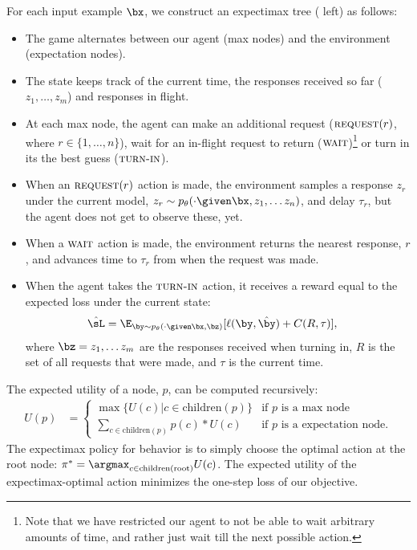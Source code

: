 For each input example $\bx$, we construct an expectimax tree ( left) as follows: 
\begin{itemize}
  \item The game alternates between our agent (max nodes) and the environment (expectation nodes).
  \item The state keeps track of the current time, the responses received so far ($z_1, \ldots, z_m$) and responses in flight.
  \item At each max node, the agent can make an additional request ($\operatorname{\textsc{request}}(r)$, where $r \in \{1, \ldots, n\}$), wait for an in-flight request to return ($\operatorname{\textsc{wait}}$)\footnote{Note that we have restricted our agent to not be able to wait arbitrary amounts of time, and rather just wait till the next possible action.} or turn in its the best guess ($\operatorname{\textsc{turn-in}}$).
  \item When an $\operatorname{\textsc{request}}(r)$ action is made, the environment samples a response $z_r$ under the current model, $z_r \sim \p(\cdot \given \bx, z_1, \dots z_n)$, and delay $\tau_r$, but the agent does not get to observe these, yet.
  \item When a $\operatorname{\textsc{wait}}$ action is made, the environment returns the nearest response, $r$, and advances time to $\tau_r$ from when the request was made.
  \item When the agent takes the $\operatorname{\textsc{turn-in}}$ action, it receives a reward equal to the expected loss under the current state:
      \begin{align*}
        \hat\sL &= \E_{\by \sim \p(\cdot \given \bx, \bz)}[\ell(\by, \byt) + C(R, \tau)],
      \end{align*}
  where $\bz = z_1, \dots z_m$ are the responses received when turning in, $R$ is the set of all requests that were made, and $\tau$ is the current time.
\end{itemize}

The expected utility of a node, $p$, can be computed recursively:
\begin{align*}
  U(p) &= 
  \begin{cases}
    \max\{ U(c) | c \in \textrm{children}(p) \} & \textrm{if $p$ is a max node} \\
    \sum_{c \in \textrm{children}(p)} p(c) * U(c) & \textrm{if $p$ is a expectation node}.
  \end{cases}
\end{align*}
The expectimax policy for behavior is to simply choose the optimal action at the root node: $\pi^* = \argmax_{c \in \textrm{children}(\textrm{root})} U(c)$.
The expected utility of the expectimax-optimal action minimizes the one-step loss of our objective.

